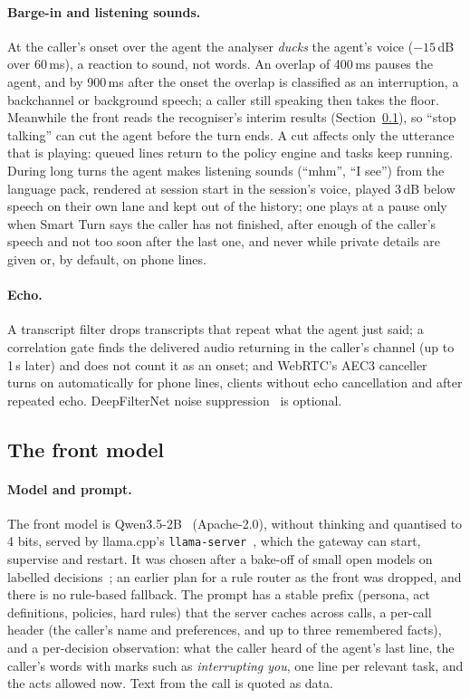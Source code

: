 \paragraph{Barge-in and listening sounds.}
At the caller's onset over the agent the analyser \emph{ducks} the agent's voice ($-15$\,dB over 60\,ms), a reaction
to sound, not words. An overlap of 400\,ms pauses the agent, and by 900\,ms after the onset the overlap is classified
as an interruption, a backchannel or background speech; a caller still speaking then takes the floor. Meanwhile the
front reads the recogniser's interim results (Section~\ref{sec:sys-front}), so ``stop talking'' can cut the agent
before the turn ends. A cut affects only the utterance that is playing: queued lines return to the policy engine and
tasks keep running. During long turns the agent makes listening sounds (``mhm'', ``I see'') from the language pack,
rendered at session start in the session's voice, played 3\,dB below speech on their own lane and kept out of the
history; one plays at a pause only when Smart Turn says the caller has not finished, after enough of the caller's
speech and not too soon after the last one, and never while private details are given or, by default, on phone lines.

\paragraph{Echo.}
A transcript filter drops transcripts that repeat what the agent just said; a correlation gate finds the delivered
audio returning in the caller's channel (up to 1\,s later) and does not count it as an onset; and WebRTC's AEC3
canceller~\citep{webrtc_src} turns on automatically for phone lines, clients without echo cancellation and after
repeated echo. DeepFilterNet noise suppression~\citep{schroeter2022deepfilternet} is optional.

\subsection{The front model}\label{sec:sys-front}

\paragraph{Model and prompt.}
The front model is Qwen3.5-2B~\citep{qwen35_2b} (Apache-2.0), without thinking and quantised to 4 bits, served by
llama.cpp's \texttt{llama-server}~\citep{llamacpp}, which the gateway can start, supervise and restart. It was chosen
after a bake-off of small open models on labelled decisions~\citep{waav_design}; an earlier plan for a rule router as
the front was dropped, and there is no rule-based fallback. The prompt has a stable prefix (persona, act definitions,
policies, hard rules) that the server caches across calls, a per-call header (the caller's name and preferences, and up
to three remembered facts), and a per-decision observation: what the caller heard of the agent's last line, the
caller's words with marks such as \emph{interrupting you}, one line per relevant task, and the acts allowed now. Text
from the call is quoted as data.

